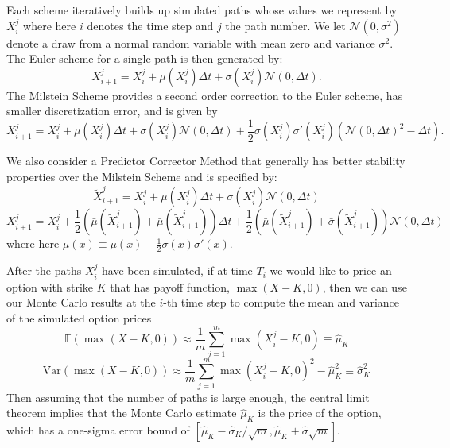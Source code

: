 \documentclass{amsart}
\begin{document}
Each scheme iteratively builds up simulated paths whose values we represent by $X_i^j$ where here 
$i$ denotes the time step and $j$ the path number. We let $\mathcal{N}(0,\sigma^2)$ denote 
a draw from a normal random variable with mean zero and variance $\sigma^2$.  
The Euler scheme for a single path is then generated by: 
%
\begin{equation}
    X_{i+1}^j = X^j_i + \mu(X_i^j)\Delta t + \sigma(X_i^j)\mathcal{N}(0,\Delta t).
\end{equation}
%
The Milstein Scheme provides a second order correction to the Euler scheme, has smaller 
discretization error, and is given by 
\begin{equation}
    X_{i+1}^j = X_i^j + \mu(X_i^j)\Delta t + \sigma(X_i^j)\mathcal{N}(0,\Delta t)
    +\frac{1}{2}\sigma(X_i^j)\sigma'(X_i^j)\left( \mathcal{N}(0,\Delta t )^2 -\Delta t\right).
\end{equation}

We also consider a Predictor Corrector Method \cite{Klo} that generally has better stability properties 
over the Milstein Scheme \cite{Klo} and is specified by:  
\begin{equation}
    \tilde{X}_{i+1}^j = X_i^j + \mu(X_i^j)\Delta t + \sigma(X_i^j)\mathcal{N}(0,\Delta t)
\end{equation}
%
\begin{equation}
    X_{i+1}^j = X_i^j + \frac{1}{2} (\bar{\mu}(\tilde{X}_{i+1}^j)+\bar{\mu}(\tilde{X}_{i+1}^j)) \Delta t
    + \frac{1}{2}(\bar{\mu}(\tilde{X}_{i+1}^j)+\bar{\sigma}(\tilde{X}_{i+1}^j))\mathcal{N}(0,\Delta t)
\end{equation}
%
where here $\bar{\mu(x)}\equiv \mu(x) - \frac{1}{2}\sigma(x)\sigma'(x)$. 

After the paths $X_i^j$ have been simulated, if at time $T_i$ we would like to price an 
option with strike $K$ that has payoff function, $\max(X-K,0)$, then we can use our Monte Carlo 
results at the $i$-th time step to compute the mean and variance of the simulated option prices 
%
\begin{equation}
    \mathbb{E}(\max(X-K,0)) \approx \frac{1}{m}\sum_{j=1}^m \max(X_i^j - K,0)\equiv\hat{\mu}_K
\end{equation}
\begin{equation}
    \mathrm{Var}(\max(X-K,0)) \approx \frac{1}{m}\sum_{j=1}^m \max(X_i^j - K,0)^2 - \hat{\mu}_K^2
    \equiv \hat{\sigma}^2_K
\end{equation}
%
Then assuming that the number of paths is large enough, the central limit theorem implies that 
the Monte Carlo estimate $\hat{\mu}_K$ is the price of the option, which has a one-sigma 
error bound of $[\hat{\mu}_K-\hat{\sigma}_K/\sqrt{m}, \hat{\mu}_K+\hat{\sigma}\sqrt{m}]$.
\end{document}
